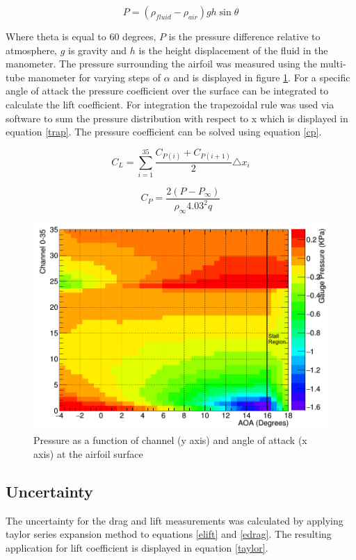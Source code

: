 \documentclass[paper=a4, fontsize=11pt, abstract=on]{scrartcl}
\numberwithin{equation}{section}		%
\numberwithin{figure}{section}			%
\numberwithin{table}{section}				%
\begin{document}
\begin{equation}
\label{sixy}
P = (\rho_{fluid}-\rho_{air})g h \sin \theta 
\end{equation}

 Where theta is equal to 60 degrees, $P$ is the pressure difference relative to atmosphere, $g$ is gravity and $h$ is the height displacement of the fluid in the manometer. The pressure surrounding the airfoil was measured using the multi-tube manometer for varying steps of $\alpha$ and is displayed in figure \ref{mult}. For a specific angle of attack the pressure coefficient over the surface can be integrated to calculate the lift coefficient. For integration the trapezoidal rule was used via software to sum the pressure distribution with respect to x which is displayed in equation \ref{trap}. The pressure coefficient can be solved using equation \ref{cp}.
  

\begin{equation}
\label{trap}
C_L = \sum_{i=1}^{35} \frac{C_{P(i)}+C_{P(i+1)}}{2}\triangle x_i
\end{equation}


\begin{equation}
\label{cp}
C_P= \frac{2(P-P_{\infty})}{\rho_{\infty}4.03^2 q}
\end{equation}


\begin{figure}[H]
\centering
\includegraphics[width=\linewidth]{m1}
\caption{Pressure as a function of channel (y axis) and angle of attack (x axis) at the airfoil surface}
\label{mult}
\end{figure} 
 
\subsection{Uncertainty} 
The uncertainty for the drag and lift measurements was calculated by applying taylor series expansion method to equations \ref{elift} and \ref{edrag}. The resulting application for lift coefficient is displayed in equation \ref{taylor}.
\end{document}
